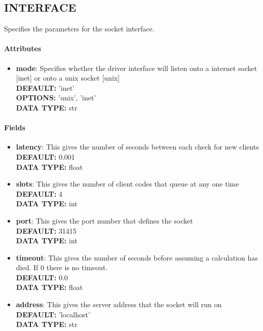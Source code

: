 \subsection{INTERFACE}
\label{INTERFACE}
Specifies the parameters for the socket interface.
\paragraph{Attributes}
 \begin{itemize}
\item {\bf mode}:
 Specifies whether the driver interface will listen onto a internet socket [inet] or onto a unix socket [unix]
{\\ \bf DEFAULT: }'inet'
{\\ \bf OPTIONS: }'unix', 'inet'
{\\ \bf DATA TYPE: }str
\end{itemize}
 
\paragraph{Fields}
 \begin{itemize}
\item {\bf latency}:
 This gives the number of seconds between each check for new clients
{\\ \bf DEFAULT: }0.001
{\\ \bf DATA TYPE: }float
\item {\bf slots}:
 This gives the number of client codes that queue at any one time
{\\ \bf DEFAULT: }4
{\\ \bf DATA TYPE: }int
\item {\bf port}:
 This gives the port number that defines the socket
{\\ \bf DEFAULT: }31415
{\\ \bf DATA TYPE: }int
\item {\bf timeout}:
 This gives the number of seconds before assuming a calculation has died. If 0 there is no timeout.
{\\ \bf DEFAULT: }0.0
{\\ \bf DATA TYPE: }float
\item {\bf address}:
 This gives the server address that the socket will run on
{\\ \bf DEFAULT: }'localhost'
{\\ \bf DATA TYPE: }str
\end{itemize}
 
